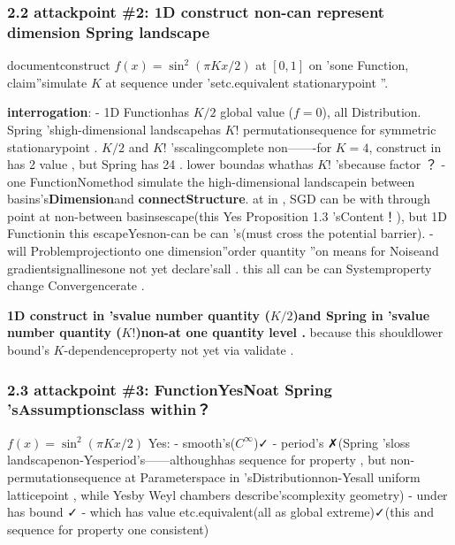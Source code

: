 \documentclass[
  12pt,
]{article}
\begin{document}
\subsubsection{2.2 attackpoint  \#2: 1D construct non-can represent dimension Spring
landscape}\label{ux653bux51fbux70b9-21d-ux6784ux9020ux4e0dux80fdux4ee3ux8868ux9ad8ux7ef4-spring-ux666fux89c2}

documentconstruct  \(f(x) = \sin^2(\pi K x / 2)\) at  \([0,1]\)
on 'sone Function, claim''simulate \(K\) at sequence under 'setc.equivalent stationarypoint ''. 

\textbf{interrogation}:  - 1D Functionhas  \(K/2\)
global value (\(f=0\)), all Distribution. Spring 'shigh-dimensional landscapehas  \(K!\)
permutationsequence for symmetric stationarypoint . \(K/2\) and  \(K!\) 'sscalingcomplete non-------for 
\(K=4\), construct in has  2 value , but  Spring has  24 . lower boundas whathas 
\(K!\) 'sbecause factor ？ -
one FunctionNomethod simulate the high-dimensional landscapein between basins's\textbf{Dimension}and \textbf{connectStructure}. at in , SGD
can be with through point at non-between basinsescape(this Yes Proposition 1.3 'sContent！), but  1D
Functionin this escapeYesnon-can be can 's(must cross the potential barrier).  -
will Problemprojectionto one dimension''order quantity ''on means for Noiseand gradientsignallinesone not yet declare'sall . this all can be can Systemproperty change Convergencerate . 

\textbf{1D construct in 'svalue number quantity (\(K/2\))and  Spring
in 'svalue number quantity (\(K!\))non-at one quantity level . } because this shouldlower bound's
\(K\)-dependenceproperty not yet via validate . 

\subsubsection{2.3 attackpoint  \#3: FunctionYesNoat  Spring
'sAssumptionsclass within？}\label{ux653bux51fbux70b9-3ux51fdux6570ux65cfux662fux5426ux5728-spring-ux7684ux5047ux8bbeux7c7bux5185}

\(f(x) = \sin^2(\pi K x / 2)\) Yes:  - smooth's(\(C^\infty\))✓ - period's
✗(Spring
'sloss landscapenon-Yesperiod's------althoughhas sequence for property , but non-permutationsequence at Parameterspace in 'sDistributionnon-Yesall uniform latticepoint , while Yesby 
Weyl chambers describe'scomplexity geometry) - under has bound  ✓ -
which has value etc.equivalent(all as global extreme)✓(this and sequence for property one consistent)
\end{document}
